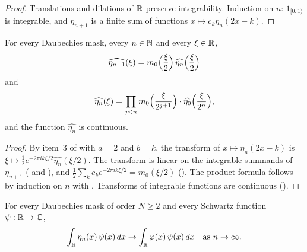 \begin{proof}
\leanok
Translations and dilations of $\mathbb{R}$ preserve integrability. Induction on $n$: $1_{[0, 1)}$ is
integrable, and $\eta_{n+1}$ is a finite sum of functions $x \mapsto c_k \eta_n(2x - k)$.
\end{proof}

\begin{proposition}
\label{prop:daub-cascade-fourier}
\leanok
{}
For every Daubechies mask, every $n \in \mathbb{N}$ and every $\xi \in \mathbb{R}$,
\[
  \widehat{\eta_{n+1}}(\xi)
  = m_0\Bigl(\frac{\xi}{2}\Bigr) \, \widehat{\eta_n}\Bigl(\frac{\xi}{2}\Bigr)
\]
and
\[
  \widehat{\eta_n}(\xi) = \prod_{j<n} m_0\Bigl(\frac{\xi}{2^{j+1}}\Bigr) \cdot
    \widehat{\eta_0}\Bigl(\frac{\xi}{2^n}\Bigr) ,
\]
and the function $\widehat{\eta_n}$ is continuous.
\end{proposition}

\begin{proof}
\leanok
{}
By item~3 of  with $a = 2$ and $b = k$, the transform of
$x \mapsto \eta_n(2x - k)$ is $\xi \mapsto \frac12 e^{-2\pi i k \xi/2} \widehat{\eta_n}(\xi/2)$.
The transform is linear on the integrable summands of $\eta_{n+1}$
( and ), and
$\frac12 \sum_k c_k e^{-2\pi i k \xi/2} = m_0(\xi/2)$ (). The product
formula follows by induction on $n$ with . Transforms of
integrable functions are continuous ().
\end{proof}

\begin{proposition}
\label{prop:daub-cascade-convergence}
\leanok
{}
For every Daubechies mask of order $N \geq 2$ and every Schwartz function $\psi : \mathbb{R} \to \mathbb{C}$,
\[
  \int_{\mathbb{R}} \eta_n(x) \, \psi(x) \, dx \to \int_{\mathbb{R}} \varphi(x) \, \psi(x) \, dx
  \quad\text{as } n \to \infty .
\]
\end{proposition}

